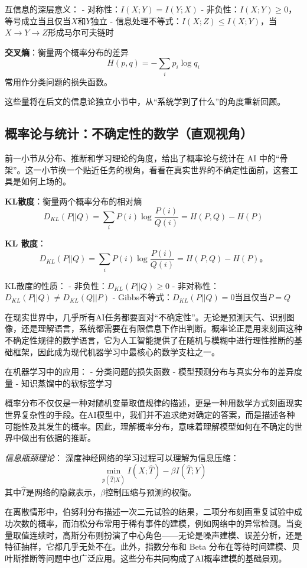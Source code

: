 互信息的深层意义：
- 对称性：$I(X;Y) = I(Y;X)$
- 非负性：$I(X;Y) \geq 0$，等号成立当且仅当$X$和$Y$独立
- 信息处理不等式：$I(X;Z) \leq I(X;Y)$，当$X \to Y \to Z$形成马尔可夫链时

\textbf{交叉熵}：衡量两个概率分布的差异
$$H(p,q) = -\sum_{i} p_i \log q_i$$
常用作分类问题的损失函数。

这些量将在后文的信息论独立小节中，从“系统学到了什么”的角度重新回顾。

\subsection{概率论与统计：不确定性的数学（直观视角）}
前一小节从分布、推断和学习理论的角度，给出了概率论与统计在 AI 中的“骨架”。这一小节换一个贴近任务的视角，看看在真实世界的不确定性面前，这套工具是如何上场的。

\textbf{KL散度}：衡量两个概率分布的相对熵
$$D_{KL}(P||Q) = \sum_{i} P(i) \log \frac{P(i)}{Q(i)} = H(P,Q) - H(P)$$

\textbf{KL 散度}：
$$
D_{KL}(P||Q) = \sum_{i} P(i) \log \frac{P(i)}{Q(i)} = H(P,Q) - H(P)。
$$

KL散度的性质：
- 非负性：$D_{KL}(P||Q) \geq 0$
- 非对称性：$D_{KL}(P||Q) \neq D_{KL}(Q||P)$
- Gibbs不等式：$D_{KL}(P||Q) = 0$当且仅当$P = Q$

在现实世界中，几乎所有AI任务都要面对“不确定性”。无论是预测天气、识别图像，还是理解语言，系统都需要在有限信息下作出判断。概率论正是用来刻画这种不确定性规律的数学语言，它为人工智能提供了在随机与模糊中进行理性推断的基础框架，因此成为现代机器学习中最核心的数学支柱之一。

在机器学习中的应用：
- 分类问题的损失函数
- 模型预测分布与真实分布的差异度量
- 知识蒸馏中的软标签学习


概率分布不仅仅是一种对随机变量取值规律的描述，更是一种用数学方式刻画现实世界复杂性的手段。在AI模型中，我们并不追求绝对确定的答案，而是描述各种可能性及其发生的概率。因此，理解概率分布，意味着理解模型如何在不确定的世界中做出有依据的推断。

\textit{信息瓶颈理论}：
深度神经网络的学习过程可以理解为信息压缩：
$$\min_{p(\hat{T}|X)} I(X; \hat{T}) - \beta I(\hat{T}; Y)$$
其中$\hat{T}$是网络的隐藏表示，$\beta$控制压缩与预测的权衡。

在离散情形中，伯努利分布描述一次二元试验的结果，二项分布刻画重复试验中成功次数的概率，而泊松分布常用于稀有事件的建模，例如网络中的异常检测。当变量取值连续时，高斯分布则扮演了中心角色——无论是噪声建模、误差分析，还是特征抽样，它都几乎无处不在。此外，指数分布和 Beta 分布在等待时间建模、贝叶斯推断等问题中也广泛应用。这些分布共同构成了AI概率建模的基础景观。

